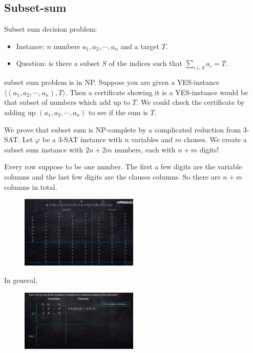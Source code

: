 \subsection{Subset-sum}
Subset sum decision problem:
\begin{itemize}
	\item Instance: $n$ numbers $a_1, a_2, \cdots, a_n$ and a target $T$.
	\item Question: is there a subset $S$ of the indices such that $\sum_{i \in S} a_i = T$.
\end{itemize}

subset sum problem is in NP. Suppose you are given a YES-instance $\langle (a_1, a_2, \cdots, a_n), T \rangle$. Then a certificate showing it is a YES-instance would be that subset of numbers which add up to $T$. We could check the certificate by adding up $(a_1, a_2, \cdots, a_n)$ to see if the sum is $T$.

We prove that subset sum is NP-complete by a complicated reduction from 3-SAT. Let $\varphi$ be a 3-SAT instance with $n$ variables and $m$ clauses. We create a subset sum instance with $2n + 2m$ numbers, each with $n+m$ digits!

Every row suppose to be one number. The first a few digits are the variable columns and the last few digits are the clauses columns. So there are $n + m$ columns in total. 

\begin{figure}[H]
	\centering
	\includegraphics[width=0.5\textwidth]{fig/subset-sum.png}	
\end{figure}

In general,
\begin{figure}[H]
	\centering
	\includegraphics[width=0.5\textwidth]{fig/subset-sum-general.png}	
\end{figure}

